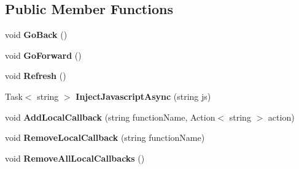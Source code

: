 \subsection*{Public Member Functions}
\begin{DoxyCompactItemize}
\item 
\mbox{\label{interface_xam_1_1_plugin_1_1_web_view_1_1_abstractions_1_1_i_forms_web_view_a652454d1cd6f4db48849c54994eb8808}} 
void {\bfseries Go\+Back} ()
\item 
\mbox{\label{interface_xam_1_1_plugin_1_1_web_view_1_1_abstractions_1_1_i_forms_web_view_a5c324187f3087f82ce022def209e8e34}} 
void {\bfseries Go\+Forward} ()
\item 
\mbox{\label{interface_xam_1_1_plugin_1_1_web_view_1_1_abstractions_1_1_i_forms_web_view_ab2687c47c9440d3bc9dc8bcf2048ce65}} 
void {\bfseries Refresh} ()
\item 
\mbox{\label{interface_xam_1_1_plugin_1_1_web_view_1_1_abstractions_1_1_i_forms_web_view_a6ba56c6c8d043cc77a0251624258bb0e}} 
Task$<$ string $>$ {\bfseries Inject\+Javascript\+Async} (string js)
\item 
\mbox{\label{interface_xam_1_1_plugin_1_1_web_view_1_1_abstractions_1_1_i_forms_web_view_afeb9d2f2750336645be09a5cb338a14e}} 
void {\bfseries Add\+Local\+Callback} (string function\+Name, Action$<$ string $>$ action)
\item 
\mbox{\label{interface_xam_1_1_plugin_1_1_web_view_1_1_abstractions_1_1_i_forms_web_view_aca5e9da2fdba46ddbf604a817e7d6b25}} 
void {\bfseries Remove\+Local\+Callback} (string function\+Name)
\item 
\mbox{\label{interface_xam_1_1_plugin_1_1_web_view_1_1_abstractions_1_1_i_forms_web_view_af595176c129fbe8269e1dae447249ebf}} 
void {\bfseries Remove\+All\+Local\+Callbacks} ()
\end{DoxyCompactItemize}
